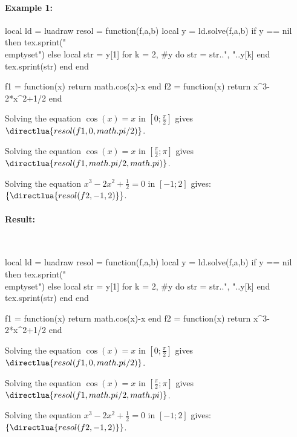 \paragraph{Example 1:}
\begin{TeXcode}
\begin{luacode}
local ld = luadraw
resol = function(f,a,b) 
    local y = ld.solve(f,a,b) 
    if y == nil then tex.sprint("\\emptyset") 
    else 
        local str = y[1] 
        for k = 2, #y do 
            str = str..", "..y[k] 
        end 
        tex.sprint(str) 
    end
end
\end{luacode}
\def\solve#1#2#3{\directlua{resol(#1,#2,#3)}}%
\begin{luacode}
f1 = function(x) return math.cos(x)-x end
f2 = function(x) return x^3-2*x^2+1/2 end
\end{luacode}
Solving the equation $\cos(x)=x$ in $[0;\frac{\pi}2]$ gives $\solve{f1}{0}{math.pi/2}$.\par
Solving the equation $\cos(x)=x$ in $[\frac{\pi}2;\pi]$ gives $\solve{f1}{math.pi/2}{math.pi}$.\par
Solving the equation $x^3-2x^2+\frac12=0$ in $[-1;2]$ gives: $\{\solve{f2}{-1}{2}\}$.
\end{TeXcode}
\paragraph{Result:}\ \par

\begin{luacode}
local ld = luadraw
resol = function(f,a,b) 
    local y = ld.solve(f,a,b) 
    if y == nil then tex.sprint("\\emptyset") 
    else 
        local str = y[1] 
        for k = 2, #y do 
            str = str..", "..y[k] 
        end 
        tex.sprint(str) 
    end
end
\end{luacode}
\def\solve#1#2#3{\directlua{resol(#1,#2,#3)}}%
\begin{luacode}
f1 = function(x) return math.cos(x)-x end
f2 = function(x) return x^3-2*x^2+1/2 end
\end{luacode}

Solving the equation $\cos(x)=x$ in $[0;\frac{\pi}2]$ gives $\solve{f1}{0}{math.pi/2}$.\par
Solving the equation $\cos(x)=x$ in $[\frac{\pi}2;\pi]$ gives $\solve{f1}{math.pi/2}{math.pi}$.\par
Solving the equation $x^3-2x^2+\frac 12=0$ in $[-1;2]$ gives: $\{\solve{f2}{-1}{2}\}$.

